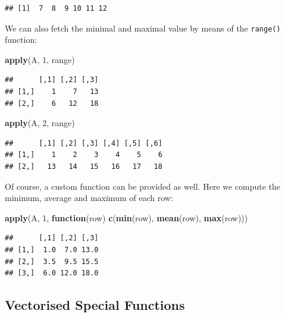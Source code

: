 \documentclass[10pt,b5paper,krantz1]{krantz}
\newenvironment{Shaded}{\begin{snugshade}}{\end{snugshade}}
\newcommand{\ControlFlowTok}[1]{\textcolor[rgb]{0.27,0.27,0.27}{\textbf{#1}}}
\newcommand{\DecValTok}[1]{\textcolor[rgb]{0.06,0.06,0.06}{#1}}
\newcommand{\KeywordTok}[1]{\textcolor[rgb]{0.27,0.27,0.27}{\textbf{#1}}}
\newcommand{\NormalTok}[1]{#1}
\begin{document}
\begin{verbatim}
## [1]  7  8  9 10 11 12
\end{verbatim}

We can also fetch the minimal and maximal value by means of the \texttt{range()} function:

\begin{Shaded}
\begin{Highlighting}[]
\KeywordTok{apply}\NormalTok{(A, }\DecValTok{1}\NormalTok{, range)}
\end{Highlighting}
\end{Shaded}

\begin{verbatim}
##      [,1] [,2] [,3]
## [1,]    1    7   13
## [2,]    6   12   18
\end{verbatim}

\begin{Shaded}
\begin{Highlighting}[]
\KeywordTok{apply}\NormalTok{(A, }\DecValTok{2}\NormalTok{, range)}
\end{Highlighting}
\end{Shaded}

\begin{verbatim}
##      [,1] [,2] [,3] [,4] [,5] [,6]
## [1,]    1    2    3    4    5    6
## [2,]   13   14   15   16   17   18
\end{verbatim}

Of course, a custom function can be provided as well.
Here we compute the minimum, average and maximum of each row:

\begin{Shaded}
\begin{Highlighting}[]
\KeywordTok{apply}\NormalTok{(A, }\DecValTok{1}\NormalTok{, }\ControlFlowTok{function}\NormalTok{(row) }\KeywordTok{c}\NormalTok{(}\KeywordTok{min}\NormalTok{(row), }\KeywordTok{mean}\NormalTok{(row), }\KeywordTok{max}\NormalTok{(row)))}
\end{Highlighting}
\end{Shaded}

\begin{verbatim}
##      [,1] [,2] [,3]
## [1,]  1.0  7.0 13.0
## [2,]  3.5  9.5 15.5
## [3,]  6.0 12.0 18.0
\end{verbatim}

\hypertarget{vectorised-special-functions}{%
\subsection{Vectorised Special Functions}\label{vectorised-special-functions}}
\end{document}
